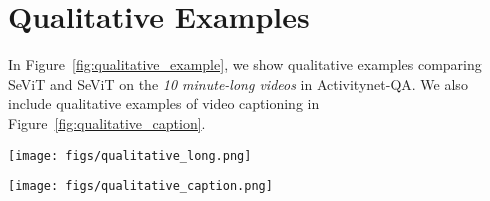 \documentclass{article}
\newcommand{\frameworkname}{SeViT}
\begin{document}
\section{Qualitative Examples}
\label{appendix:qualitative}

In Figure~\ref{fig:qualitative_example}, we show qualitative examples comparing \frameworkname{} and \frameworkname{} on the \textit{10 minute-long videos} in Activitynet-QA. We also include qualitative examples of video captioning in Figure~\ref{fig:qualitative_caption}.

\begin{figure*}[t!] 
\centering
\texttt{[image: figs/qualitative\_long.png]}
\caption{We show efficacy of \frameworkname{} by qualitative examples. To this end, we compare \frameworkname and \frameworkname in videos \textit{longer than 10 minutes} from Activitynet-QA. The results show that a baseline based on frame sampling, \frameworkname, fails to find relevant frames from the long videos while \frameworkname successfully finds query-relevant frames.}
\label{fig:qualitative_example}
\end{figure*}

\begin{figure*}[t!] 
\centering
\texttt{[image: figs/qualitative\_caption.png]}
\caption{Qualitative examples of video captioning. We compare \frameworkname and \frameworkname on videos in MSRVTT-Caption (top) and MSVD-Caption (bottom). Especially, the top example shows the case that frames by \frameworkname, \ie, random frame sampling, include uninformative frames resulting in performance degradation.}
\label{fig:qualitative_caption}
\end{figure*} 
\end{document}
